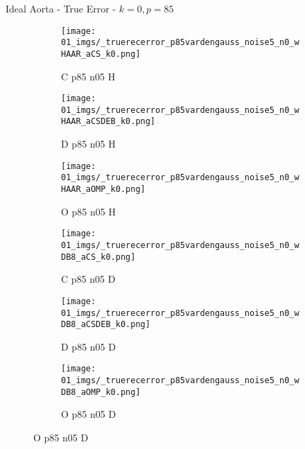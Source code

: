 \begin{frame}{Ideal Aorta - True Error - $k=0,p=85$}{}
\begin{figure}
\begin{subfigure}{0.13\textwidth}
\texttt{[image: 01\_imgs/\_truerecerror\_p85vardengauss\_noise5\_n0\_wHAAR\_aCS\_k0.png]}
\caption*{\tiny C p85 n05 H}
\end{subfigure}
\begin{subfigure}{0.13\textwidth}
\texttt{[image: 01\_imgs/\_truerecerror\_p85vardengauss\_noise5\_n0\_wHAAR\_aCSDEB\_k0.png]}
\caption*{\tiny D p85 n05 H}
\end{subfigure}
\begin{subfigure}{0.13\textwidth}
\texttt{[image: 01\_imgs/\_truerecerror\_p85vardengauss\_noise5\_n0\_wHAAR\_aOMP\_k0.png]}
\caption*{\tiny O p85 n05 H}
\end{subfigure}
\begin{subfigure}{0.13\textwidth}
\texttt{[image: 01\_imgs/\_truerecerror\_p85vardengauss\_noise5\_n0\_wDB8\_aCS\_k0.png]}
\caption*{\tiny C p85 n05 D}
\end{subfigure}
\begin{subfigure}{0.13\textwidth}
\texttt{[image: 01\_imgs/\_truerecerror\_p85vardengauss\_noise5\_n0\_wDB8\_aCSDEB\_k0.png]}
\caption*{\tiny D p85 n05 D}
\end{subfigure}
\begin{subfigure}{0.13\textwidth}
\texttt{[image: 01\_imgs/\_truerecerror\_p85vardengauss\_noise5\_n0\_wDB8\_aOMP\_k0.png]}
\caption*{\tiny O p85 n05 D}
\end{subfigure}

\vspace{5pt}


\end{figure}
\end{frame}
